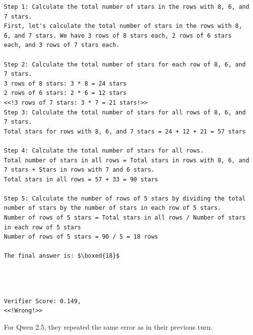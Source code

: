 \begin{lstlisting}[breaklines=true]
Step 1: Calculate the total number of stars in the rows with 8, 6, and 7 stars.
First, let's calculate the total number of stars in the rows with 8, 6, and 7 stars. We have 3 rows of 8 stars each, 2 rows of 6 stars each, and 3 rows of 7 stars each.

Step 2: Calculate the total number of stars for each row of 8, 6, and 7 stars.
3 rows of 8 stars: 3 * 8 = 24 stars
2 rows of 6 stars: 2 * 6 = 12 stars
<<!3 rows of 7 stars: 3 * 7 = 21 stars!>>
Step 3: Calculate the total number of stars for all rows of 8, 6, and 7 stars.
Total stars for rows with 8, 6, and 7 stars = 24 + 12 + 21 = 57 stars

Step 4: Calculate the total number of stars for all rows.
Total number of stars in all rows = Total stars in rows with 8, 6, and 7 stars + Stars in rows with 7 and 6 stars.
Total stars in all rows = 57 + 33 = 90 stars

Step 5: Calculate the number of rows of 5 stars by dividing the total number of stars by the number of stars in each row of 5 stars.
Number of rows of 5 stars = Total stars in all rows / Number of stars in each row of 5 stars
Number of rows of 5 stars = 90 / 5 = 18 rows

The final answer is: $\boxed{18}$




\end{lstlisting}

\begin{lstlisting}
Verifier Score: 0.149,
<<!Wrong!>> 
\end{lstlisting}
For Qwen 2.5, they repeated the same error as in their previous turn.












